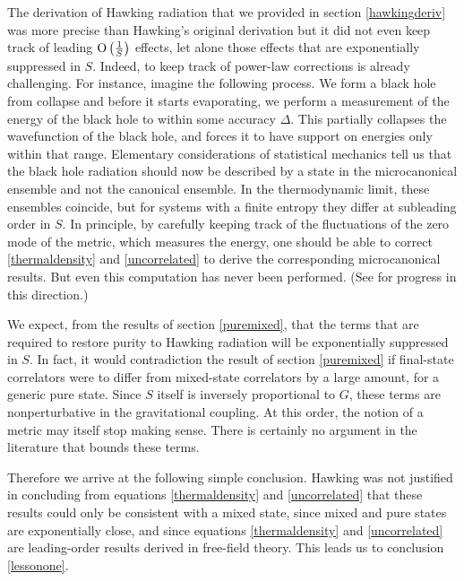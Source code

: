 \documentclass[12pt]{article}
\def\gnewt{G}
\def\Or[#1]{{\text{O}}\left({#1}\right)}
\begin{document}
The derivation of Hawking radiation that we provided in section \ref{hawkingderiv} was more precise than Hawking's original derivation but it did not even keep track of leading  $\Or[{1 \over S}]$ effects, let alone those effects that are exponentially suppressed in $S$. Indeed, to keep track of power-law corrections is already challenging. For instance, imagine the following process. We form a black hole from collapse and before it starts evaporating, we perform a measurement of the energy of the black hole to within some accuracy $\Delta$. This partially collapses the wavefunction of the black hole, and forces it to have support on energies only within that range. Elementary considerations of statistical mechanics tell us that the black hole radiation should now be described by a state in the microcanonical ensemble and not the canonical ensemble. In the thermodynamic limit, these ensembles coincide, but for systems with a finite
entropy they differ at subleading order in $S$. In principle, by carefully keeping track of the fluctuations of the zero mode of the metric, which measures the energy, one should be able to correct \eqref{thermaldensity} and \eqref{uncorrelated} to derive the corresponding microcanonical results. But even this computation has never been performed. (See \cite{Brustein:2013ena,Brustein:2013qma,Saini:2015dea} for progress in this direction.)

We expect, from the results of section \ref{puremixed}, that the terms that are required to restore purity to Hawking radiation will be exponentially suppressed in $S$. In fact, it would contradiction the result of section \ref{puremixed} if final-state correlators were to differ from mixed-state correlators by a large amount, for a generic pure state.
Since $S$ itself is inversely proportional to $\gnewt$, these terms are nonperturbative in the gravitational coupling. At this order, the notion of a metric may itself stop making sense. There is certainly no argument in the literature that bounds these terms.


Therefore we arrive at the following simple conclusion. Hawking was not justified in concluding from equations \eqref{thermaldensity} and \eqref{uncorrelated} that these results could only be consistent with a mixed state, since mixed and pure states are exponentially close, and since equations \eqref{thermaldensity} and \eqref{uncorrelated} are leading-order results derived in free-field theory. This leads us to conclusion \ref{lessonone}.
\end{document}
